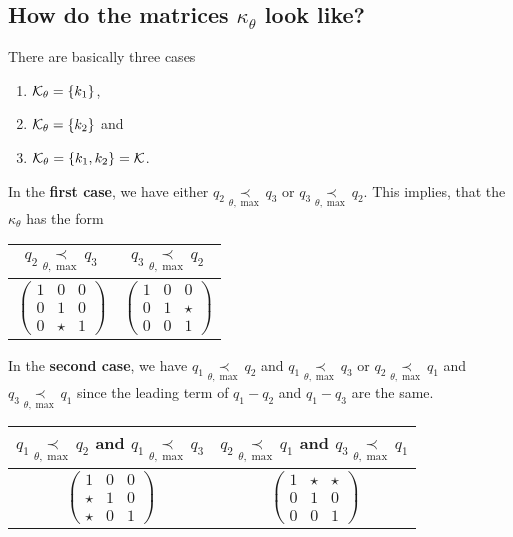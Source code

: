 \subsection{How do the matrices $\kappa_\theta$ look like?}
There are basically three cases
\begin{enumerate}
  \item $\mathcal{K}_\theta=\{k_1\}$,
  \item $\mathcal{K}_\theta=\{k_2\}$ and
  \item $\mathcal{K}_\theta=\{k_1,k_2\}=\mathcal{K}$.
\end{enumerate}
\begin{comment}
  The first two cases are similar, the last is different.
\end{comment}
In the \textbf{first case}, we have either
$q_2 \underset{\theta,\max}{\prec} q_3$ or
$q_3 \underset{\theta,\max}{\prec} q_2$.
This implies, that the  $\kappa_\theta$ has the form
\begin{center}
  \begin{tabular}{c|c}
    $q_2 \underset{\theta,\max}{\prec} q_3$
    &
    $q_3 \underset{\theta,\max}{\prec} q_2$
    \tabularnewline
    \hline 
  $\begin{pmatrix}
    1 & 0 & 0
  \\0 & 1 & 0
  \\0 & \star & 1
  \end{pmatrix}$
  & 
  $\begin{pmatrix}
    1 & 0 & 0
  \\0 & 1 & \star
  \\0 & 0 & 1
  \end{pmatrix}$\tabularnewline
  \end{tabular}
  \TODO[correct?]
\end{center}

In the \textbf{second case}, we have $q_1 \underset{\theta,\max}{\prec} q_2$
and $q_1 \underset{\theta,\max}{\prec} q_3$ or
$q_2 \underset{\theta,\max}{\prec} q_1$ and
$q_3 \underset{\theta,\max}{\prec} q_1$ since the leading term of $q_1-q_2$ and
$q_1-q_3$ are the same.
\TODO[\dots]
\begin{center}
  \begin{tabular}{c|c}
    $q_1 \underset{\theta,\max}{\prec} q_2$ and
    $q_1 \underset{\theta,\max}{\prec} q_3$
    &
    $q_2 \underset{\theta,\max}{\prec} q_1$ and
    $q_3 \underset{\theta,\max}{\prec} q_1$
    \tabularnewline
    \hline 
    $\begin{pmatrix}1 & 0 & 0\\
    \star & 1 & 0\\
    \star & 0 & 1
  \end{pmatrix}$
  &
  $\begin{pmatrix}1 & \star & \star\\
    0 & 1 & 0\\
    0 & 0 & 1
  \end{pmatrix}$\tabularnewline
  \end{tabular}
  \TODO[correct?]
\end{center}

